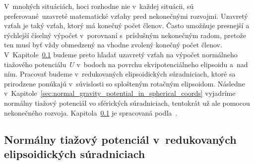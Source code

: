 \documentclass[a4paper, 12pt]{book}
\begin{document}
V~mnohých situáciách, hoci rozhodne nie v~každej situácii, sú 
preferované~uzavreté matematické vzťahy pred nekonečnými rozvojmi.  Uzavretý 
vzťah je taký vzťah, ktorý má konečný počet členov.  Často umožňuje presnejší 
a rýchlejší číselný výpočet v~porovnaní s~príslušným nekonečným radom, pretože 
ten musí byť vždy obmedzený na vhodne zvolený konečný počet členov.  
V~Kapitole~\ref{sec:normal_gravity_potential_in_reduced_ell_coords} budeme 
preto hľadať uzavretý vzťah na výpočet normálneho tiažového potenciálu~$U$ 
v~bodoch na povrchu ekvipotenciálneho elipsoidu a~nad ním.  Pracovať budeme 
v~redukovaných elipsoidických súradniciach, ktoré sa prirodzene ponúkajú 
v~súvislosti so splošteným rotačným elipsoidom.  Následne 
v~Kapitole~\ref{sec:normal_gravity_potential_in_spherical_coords} vyjadríme 
normálny tiažový potenciál vo sférických súradniciach, tentokrát už ale pomocou 
nekonečného rozvoja.  
Kapitola~\ref{sec:normal_gravity_potential_in_reduced_ell_coords} je spracovaná 
podľa~\textcite{MoritzTheFigureOfTheEarth}.



\subsection{Normálny tiažový potenciál v~redukovaných elipsoidických 
súradniciach}
\label{sec:normal_gravity_potential_in_reduced_ell_coords}
\end{document}
